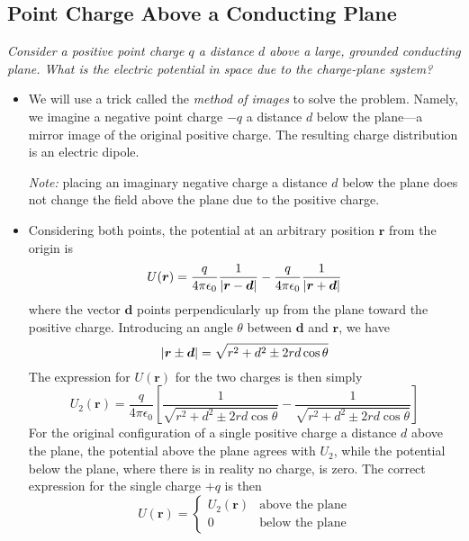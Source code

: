 \documentclass[11pt, a4paper]{article}
\renewcommand{\vec}[1]{\bm{#1}} %
\renewcommand{\r}{\vec{r}}
\newcommand{\ee}{\epsilon_{0}}  %
\begin{document}
\subsection{Point Charge Above a Conducting Plane}
\textit{Consider a positive point charge $ q $ a distance $ d $ above a large, grounded conducting plane. What is the electric potential in space due to the charge-plane system?}
\begin{itemize}
	\item We will use a trick called the \textit{method of images} to solve the problem. 
	Namely, we imagine a negative point charge $ -q $ a distance $ d $ below the plane---a mirror image of the original positive charge. The resulting charge distribution is an electric dipole. 
	
	\textit{Note:} placing an imaginary negative charge a distance $ d $ below the plane does not change the field above the plane due to the positive charge. 
	
	\item Considering both points, the potential at an arbitrary position $ \r $ from the origin is
	\begin{equation*}
		U(\r) = \frac{q}{4\pi \ee}\frac{1}{\abs{\r - \vec{d}}} - \frac{q}{4\pi \ee}\frac{1}{\abs{\r + \vec{d}}} 
	\end{equation*}
	where the vector $ \vec{d} $ points perpendicularly up from the plane toward the positive charge. Introducing an angle $ \theta $ between $ \vec{d} $ and $ \r $, we have
	\begin{equation*}
		\abs{\r \pm \vec{d}} = \sqrt{r^{2}+d^{2} \pm 2rd\cos \theta}
	\end{equation*}
	The expression for $ U(\r) $ for the two charges is then simply
	\begin{equation*}
		U_{2}(\r) = \frac{q}{4\pi \ee}\left[\frac{1}{\sqrt{r^{2}+d^{2} \pm 2rd\cos \theta}} - \frac{1}{\sqrt{r^{2}+d^{2} \pm 2rd\cos \theta}}\right]
	\end{equation*}
	For the original configuration of a single positive charge a distance $ d $ above the plane, the potential above the plane agrees with $ U_{2} $, while the potential below the plane, where there is in reality no charge, is zero. The correct expression for the single charge $ +q $ is then
	\begin{equation*}
		U(\r) = 
		\begin{cases}
			U_{2}(\r) & \text{above the plane}\\
			0 & \text{below the plane}
		\end{cases}
	\end{equation*}
	

\end{itemize}
\end{document}
